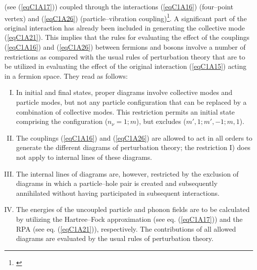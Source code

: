 (see (\ref{eqC1A17})) coupled through the interactions (\ref{eqC1A16}) (four--point vertex) and (\ref{eqC1A26}) (particle--vibration coupling)\footnote{\cite{Bes:74,Broglia:76}}. A significant
part of the original interaction has already been included in generating the
collective mode (\ref{eqC1A21}). This implies that the rules for evaluating the effect of
the couplings (\ref{eqC1A16}) and (\ref{eqC1A26}) between fermions and bosons involve a number of restrictions as compared with the usual rules of perturbation theory that
are to be utilized in evaluating the effect of the original interaction (\ref{eqC1A15}) acting
in a fermion space. They read as follows:
\begin{enumerate}[I)]
\item In initial and final states, proper diagrams involve collective modes
and particle modes, but not any particle configuration that can be replaced by
a combination of collective modes. This restriction permits an initial state
comprising the configuration ($n_\nu =1;m$), but excludes ($m', 1; m',-1; m,1$).
\item The couplings (\ref{eqC1A16}) and (\ref{eqC1A26}) are allowed to act in all orders to
generate the different diagrams of perturbation theory; the restriction I) does
not apply to internal lines of these diagrams.
\item The internal lines of diagrams are, however, restricted by the exclusion of diagrams in which a particle--hole pair is created and subsequently
annihilated without having participated in subsequent interactions.
\item The energies of the uncoupled particle and phonon fields are to be
calculated by utilizing the Hartree--Fock approximation (see eq. (\ref{eqC1A17})) and the
RPA (see eq. (\ref{eqC1A21})), respectively. The contributions of all allowed diagrams are
evaluated by the usual rules of perturbation theory.
\end{enumerate}

